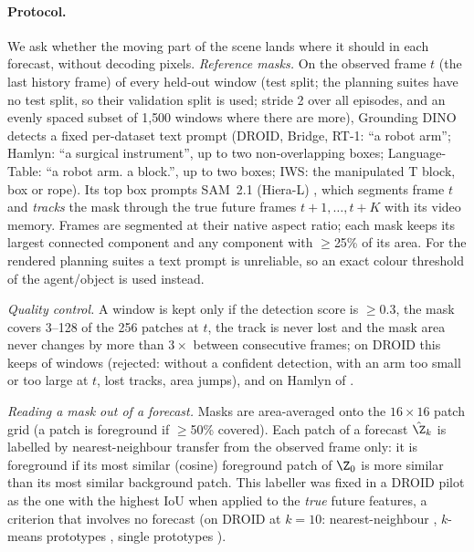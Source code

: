\paragraph{Protocol.} We ask whether the moving part of the scene lands where it should in each forecast, without
decoding pixels. \emph{Reference masks.} On the observed frame $t$ (the last history frame) of every held-out window
(test split; the planning suites have no test split, so their validation split is used; stride 2 over all episodes, and an evenly spaced subset of 1{,}500 windows where there are more),
Grounding DINO \citep{liu2024groundingdino} detects a fixed per-dataset text prompt (DROID, Bridge, RT-1: ``a robot arm'';
Hamlyn: ``a surgical instrument'', up to two non-overlapping boxes; Language-Table: ``a robot arm. a block.'', up to two boxes; IWS: the manipulated T block, box or rope). Its
top box prompts SAM~2.1 (Hiera-L) \citep{ravi2025sam2}, which segments frame $t$ and \emph{tracks} the mask through the
true future frames $t{+}1,\dots,t{+}K$ with its video memory. Frames are segmented at their native aspect ratio; each
mask keeps its largest connected component and any component with $\ge$25\% of its area. For the rendered planning
suites a text prompt is unreliable, so an exact colour threshold of the agent/object is used instead.

\emph{Quality
control.} A window is kept only if the detection score is $\ge 0.3$, the mask covers 3--128 of the 256 patches at $t$,
the track is never lost and the mask area never changes by more than $3\times$ between consecutive frames; on DROID
this keeps \segDroidWindows{} of \segDroidConsidered{} windows (rejected: \segDroidRejNoDetection{} without a
confident detection, \segDroidRejFgAreaAtT{} with an arm too small or too large at $t$, \segDroidRejLostTrack{} lost
tracks, \segDroidRejAreaJump{} area jumps), and on Hamlyn \segHamlynWindows{} of \segHamlynConsidered{}.

\emph{Reading a mask out of a forecast.} Masks are area-averaged onto the $16{\times}16$ patch grid (a patch is
foreground if $\ge$50\% covered). Each patch of a forecast $\hat\Z_k$ is labelled by nearest-neighbour transfer
from the observed frame only: it is foreground if its most similar (cosine) foreground patch of $\Z_0$ is more similar
than its most similar background patch. This labeller was fixed in a DROID pilot as the one with the highest IoU when
applied to the \emph{true} future features, a criterion that involves no forecast (on DROID at $k{=}10$:
nearest-neighbour \segDroidOracleNn{}, $k$-means prototypes \segDroidOracleMulti{}, single prototypes
\segDroidOracleProto{}).

